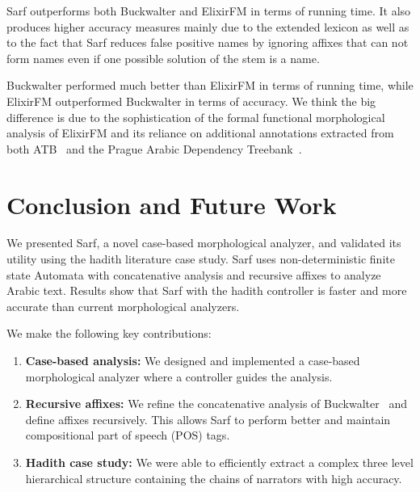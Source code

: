 \documentclass[11pt]{article}
\begin{document}
Sarf outperforms both Buckwalter and ElixirFM in terms of 
running time. 
It also produces higher accuracy measures 
mainly due to the extended
lexicon as well as to the fact that Sarf reduces false positive
names by ignoring affixes that can not form
names even if one possible solution of the stem is a name. 

Buckwalter performed much better than ElixirFM in 
terms of running time, 
while ElixirFM outperformed Buckwalter in terms of accuracy.
We think the big difference is due to the sophistication of 
the formal functional morphological analysis of ElixirFM 
and its reliance on additional annotations extracted from 
both ATB~\cite{Maamouri:04} and the Prague Arabic Dependency Treebank~\cite{Prague04}.

\section{Conclusion and Future Work}
\label{sec:future}

We presented Sarf, a novel case-based morphological analyzer,
and validated its utility using the hadith literature
case study. 
Sarf uses non-deterministic finite state Automata with 
concatenative analysis and recursive affixes to analyze 
Arabic text. 
Results show that Sarf with the hadith controller
is faster and more accurate than
current morphological analyzers.


We make the following key contributions: 
\begin{enumerate}
\item {\bf Case-based analysis:}  We designed and implemented
a case-based morphological analyzer where a controller
guides the analysis. 
\item {\bf Recursive affixes:}
We refine the concatenative analysis of 
Buckwalter~ and define affixes
recursively. 
This allows Sarf to perform better and 
maintain compositional part of speech (POS) tags.
\item {\bf Hadith case study:}
We were able to efficiently extract a complex three 
level hierarchical 
structure containing the chains of narrators 
with high accuracy. 
\end{enumerate}
\end{document}
